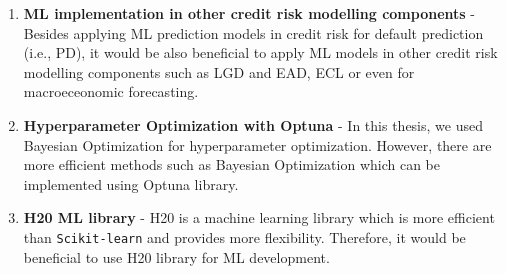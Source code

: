 \begin{enumerate}
    \item \textbf{ML implementation in other credit risk modelling components} - Besides applying ML prediction models in credit risk for default prediction (i.e., PD), it would be also beneficial to apply ML models in other credit risk modelling components such as LGD and EAD, ECL or even for macroeceonomic forecasting.
    \item \textbf{Hyperparameter Optimization with Optuna} - In this thesis, we used Bayesian Optimization for hyperparameter optimization. However, there are more efficient methods such as Bayesian Optimization which can be implemented using Optuna library.
    \item \textbf{H20 ML library} - H20 is a machine learning library which is more efficient than \lstinline{Scikit-learn} and provides more flexibility. Therefore, it would be beneficial to use H20 library for ML development.
\end{enumerate}